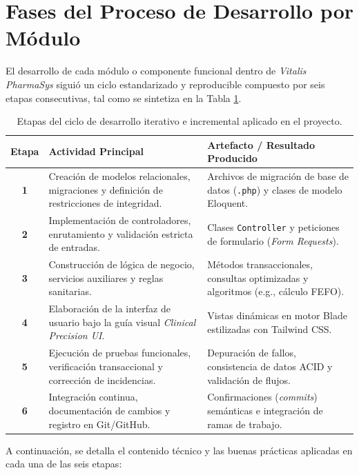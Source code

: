 \section{Fases del Proceso de Desarrollo por Módulo}

El desarrollo de cada módulo o componente funcional dentro de \textit{Vitalis PharmaSys} siguió un ciclo estandarizado y reproducible compuesto por seis etapas consecutivas, tal como se sintetiza en la Tabla \ref{tab:etapas_desarrollo}.

\begin{table}[H]
\centering
\caption{Etapas del ciclo de desarrollo iterativo e incremental aplicado en el proyecto.}
\label{tab:etapas_desarrollo}
\renewcommand{\arraystretch}{1.3}
\begin{tabularx}{\textwidth}{|c|X|X|}
\hline
\rowcolor[HTML]{E5E9EB}
\textbf{Etapa} & \textbf{Actividad Principal} & \textbf{Artefacto / Resultado Producido} \\ \hline
\textbf{1} & Creación de modelos relacionales, migraciones y definición de restricciones de integridad. & Archivos de migración de base de datos (\texttt{.php}) y clases de modelo Eloquent. \\ \hline
\textbf{2} & Implementación de controladores, enrutamiento y validación estricta de entradas. & Clases \texttt{Controller} y peticiones de formulario (\textit{Form Requests}). \\ \hline
\textbf{3} & Construcción de lógica de negocio, servicios auxiliares y reglas sanitarias. & Métodos transaccionales, consultas optimizadas y algoritmos (e.g., cálculo FEFO). \\ \hline
\textbf{4} & Elaboración de la interfaz de usuario bajo la guía visual \textit{Clinical Precision UI}. & Vistas dinámicas en motor Blade estilizadas con Tailwind CSS. \\ \hline
\textbf{5} & Ejecución de pruebas funcionales, verificación transaccional y corrección de incidencias. & Depuración de fallos, consistencia de datos ACID y validación de flujos. \\ \hline
\textbf{6} & Integración continua, documentación de cambios y registro en Git/GitHub. & Confirmaciones (\textit{commits}) semánticas e integración de ramas de trabajo. \\ \hline
\end{tabularx}
\end{table}

A continuación, se detalla el contenido técnico y las buenas prácticas aplicadas en cada una de las seis etapas:

